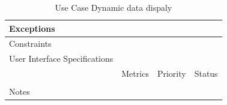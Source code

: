 \begin{table}[H]
\begin{tabularx}{\linewidth}{|l|X|X|X|}
            \hline Exceptions                    & \multicolumn{3}{l|}{}                                                                                 \\

            \hline Constraints                   & \multicolumn{3}{l|}{}                                                                                 \\

            \hline User Interface Specifications & \multicolumn{3}{l|}{}                                                                                 \\

            \hline \multirow{2}{*}{}             & Metrics                                                                           & Priority & Status \\
            \cline{2-4}                          &                                                                                   &          &        \\
            \hline Notes                         & \multicolumn{3}{l|}{}                                                                                 \\
            \hline
      \end{tabularx}
      \caption{Use Case Dynamic data dispaly}
      \label{tab:use_case_dynamic_data_dispaly}
\end{table}

